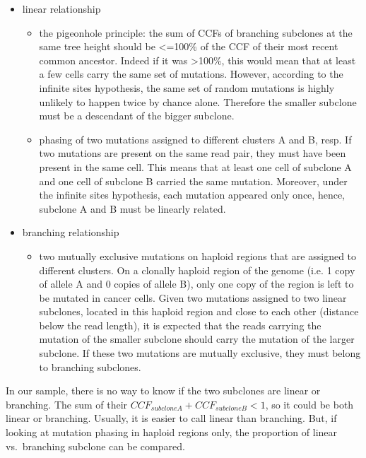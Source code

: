 \documentclass[]{article}
\begin{document}
\begin{itemize}
\item{linear relationship}
  \begin{itemize}
 \item{the pigeonhole principle: the sum of CCFs of branching
     subclones at the same tree height should be <=100\% of the CCF of
     their most recent common ancestor. Indeed if it was >100\%, this
     would mean that at least a few cells carry the same set of
     mutations. However, according to the infinite sites hypothesis, the same set of random mutations is highly
     unlikely to happen twice by chance alone. Therefore the
     smaller subclone must be a descendant of the bigger subclone.}
 \item{phasing of two mutations assigned to different clusters A and B, resp. If two
     mutations are present on the same read pair, they must have been
     present in the same cell. This means that at least one cell of subclone A and
     one cell of subclone B carried the same mutation. Moreover, under
     the infinite sites hypothesis, each mutation appeared only once,
     hence, subclone A and B must be linearly related. }
 \end{itemize}
\item{branching relationship}
  \begin{itemize}
  \item{two mutually exclusive mutations on haploid
      regions that are assigned to different clusters. On a clonally haploid
      region of the genome (i.e. 1 copy of allele A and 0 copies of
      allele B), only one copy of the region is left to be
      mutated in cancer cells. Given two mutations assigned to two linear subclones,
      located in this haploid region and close to each other (distance
      below the read length), it is expected that the
      reads carrying the mutation of the smaller subclone should carry
      the mutation of the larger subclone. If these two mutations are
      mutually exclusive, they must belong to branching subclones.}
  \end{itemize}
\end{itemize}

In our sample, there is no way to know if the two subclones are linear
or branching. The sum of their \(CCF_{subcloneA}+CCF_{subcloneB}<1\), so
it could be both linear or branching. Usually, it is easier to call
linear than branching. But, if looking at mutation phasing in haploid
regions only, the proportion of linear vs.~branching subclone can be
compared.
\end{document}
